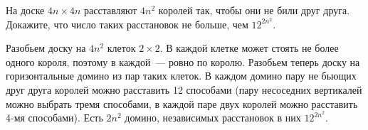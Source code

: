 \problem
На доске $4 n \times 4 n$ расставляют $4 n^2$ королей так, чтобы они не били
друг друга.
Докажите, что число таких расстановок не больше, чем $12^{2n^2}$.

\solution
Разобьем доску на $4 n^2$ клеток $2 \times 2$.
В каждой клетке может стоять не более одного короля, поэтому в каждой~--- ровно
по королю.
Разобьем теперь доску на горизонтальные домино из пар таких клеток.
В каждом домино пару не бьющих друг друга королей можно расставить 12 способами
(пару несоседних вертикалей можно выбрать тремя способами, в каждой паре двух
королей можно расставить 4-мя способами).
Есть $2 n^2$ домино, независимых расстановок в них $12^{2n^2}$.
\endproblem
